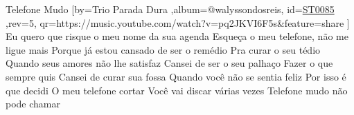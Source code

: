 \beginsong
{Telefone Mudo %
}[by={Trio Parada Dura %
},album={@walyssondosreis},
id={\href{https://music.youtube.com/watch?v=pq2JKVI6F5s&feature=share %
}{ST0085 %
}},rev={5}, %
qr={https://music.youtube.com/watch?v=pq2JKVI6F5s&feature=share %
}]
\beginverse
Eu quero que risque o meu nome da sua agenda
Esqueça o meu telefone, não me ligue mais
Porque já estou cansado de ser o remédio
Pra curar o seu tédio
Quando seus amores não lhe satisfaz
\endverse
\beginverse
Cansei de ser o seu palhaço
Fazer o que sempre quis
Cansei de curar sua fossa
Quando você não se sentia feliz
\endverse
\beginverse
Por isso é que decidi
O meu telefone cortar
Você vai discar várias vezes
Telefone mudo não pode chamar
\endverse
{}
\vspace{4em} %
\begin{comment}
\lstset{basicstyle=\scriptsize\bf} %
\tab{Solo 1}
\begin{lstlisting}
E|-----------------------------------------------------|
B|-----------------------------------------------------|
G|-----------------------------------------------------|
D|-----------------------------------------------------|
A|-----------------------------------------------------|
E|-----------------------------------------------------|
\end{lstlisting}
\end{comment}
\begin{comment}

\color{drawChord}\gtab{\color{nameChord} X}{}%
\color{drawChord}\gtab{\color{nameChord} X}{}%
\color{drawChord}\gtab{\color{nameChord} X}{}%
\color{drawChord}\gtab{\color{nameChord} X}{}%

\end{comment}
